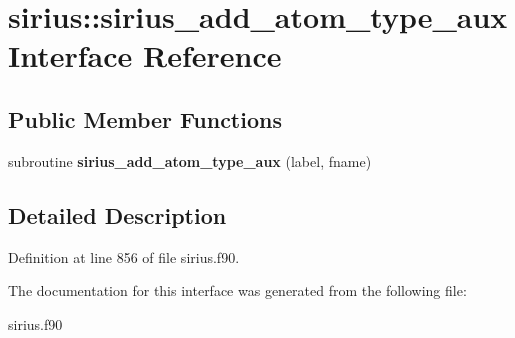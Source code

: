 \hypertarget{interfacesirius_1_1sirius__add__atom__type__aux}{}\section{sirius\+:\+:sirius\+\_\+add\+\_\+atom\+\_\+type\+\_\+aux Interface Reference}
\label{interfacesirius_1_1sirius__add__atom__type__aux}
\subsection*{Public Member Functions}
\begin{DoxyCompactItemize}
\item 
\hypertarget{interfacesirius_1_1sirius__add__atom__type__aux_a51e097a48dfdf01a14f8f27a9f209fb3}{}subroutine {\bfseries sirius\+\_\+add\+\_\+atom\+\_\+type\+\_\+aux} (label, fname)\label{interfacesirius_1_1sirius__add__atom__type__aux_a51e097a48dfdf01a14f8f27a9f209fb3}

\end{DoxyCompactItemize}


\subsection{Detailed Description}


Definition at line 856 of file sirius.\+f90.



The documentation for this interface was generated from the following file\+:\begin{DoxyCompactItemize}
\item 
sirius.\+f90\end{DoxyCompactItemize}
